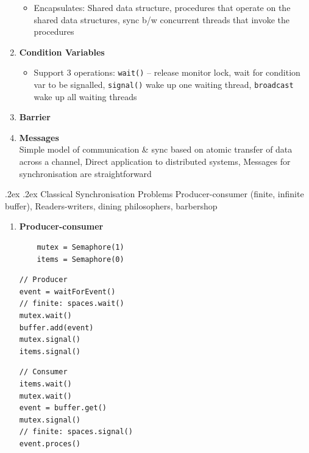\documentclass[10pt,landscape,a4paper]{article}
\makeatletter
\renewcommand{\subsubsection}{\@startsection{subsubsection}{1}{0mm}%
  {.2ex}%
  {.2ex}%
{\rmfamily\bfseries}}
\makeatother
\begin{document}
\begin{multicols*}{4}
\begin{enumerate}
\begin{itemize}
      \item Encapsulates: Shared data structure, procedures that operate on the shared data structures, sync b/w concurrent threads that invoke the procedures
    \end{itemize}
    \item \textbf{Condition Variables}
    \begin{itemize}
      \item Support 3 operations: \texttt{wait()} -- release monitor lock, wait for condition var to be signalled, \texttt{signal()} wake up one waiting thread, \texttt{broadcast} wake up all waiting threads
    \end{itemize}
    \item \textbf{Barrier}
    \item \textbf{Messages}\\
    Simple model of communication \& sync based on atomic transfer of data across a channel, Direct application to distributed systems, Messages for synchronisation are straightforward
  \end{enumerate}
  \subsubsection{Classical Synchronisation Problems}
  Producer-consumer (finite, infinite buffer), Readers-writers, dining philosophers, barbershop
  \begin{enumerate}
    \item \textbf{Producer-consumer}
    \begin{verbatim}
    mutex = Semaphore(1)
    items = Semaphore(0)
    \end{verbatim}
    \begin{multicols*}{2}
      \begin{verbatim}
// Producer
event = waitForEvent()
// finite: spaces.wait()
mutex.wait()
buffer.add(event)
mutex.signal()
items.signal()
      \end{verbatim}
      \begin{verbatim}
// Consumer
items.wait()
mutex.wait()
event = buffer.get()
mutex.signal()
// finite: spaces.signal()
event.proces()
      \end{verbatim}
    \end{multicols*}
  \end{enumerate}

\end{multicols*}
\end{document}
